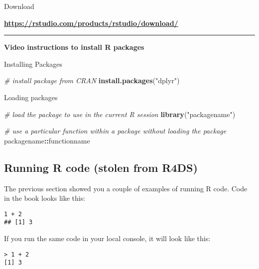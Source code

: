 \documentclass[]{article}
\newenvironment{Shaded}{\begin{snugshade}}{\end{snugshade}}
\newcommand{\CommentTok}[1]{\textcolor[rgb]{0.56,0.35,0.01}{\textit{#1}}}
\newcommand{\KeywordTok}[1]{\textcolor[rgb]{0.13,0.29,0.53}{\textbf{#1}}}
\newcommand{\NormalTok}[1]{#1}
\newcommand{\OperatorTok}[1]{\textcolor[rgb]{0.81,0.36,0.00}{\textbf{#1}}}
\newcommand{\StringTok}[1]{\textcolor[rgb]{0.31,0.60,0.02}{#1}}
\newenvironment{rmdattachment}
  {\begin{center}}
  {\end{center}}
\newenvironment{rmdblankbox}
  {\begin{center}}
  {\end{center}}
\begin{document}
\begin{rmdblankbox}
Download
\end{rmdblankbox}
\begin{rmdattachment}
\textbf{\url{https://rstudio.com/products/rstudio/download/}}
\end{rmdattachment}

\begin{center}\rule{0.5\linewidth}{0.5pt}\end{center}

\textbf{Video instructions to install R packages}

Installing Packages

\begin{Shaded}
\begin{Highlighting}[]
\CommentTok{# install package from CRAN}
\KeywordTok{install.packages}\NormalTok{(}\StringTok{"dplyr"}\NormalTok{)   }
\end{Highlighting}
\end{Shaded}

Loading packages

\begin{Shaded}
\begin{Highlighting}[]
\CommentTok{# load the package to use in the current R session}
\KeywordTok{library}\NormalTok{(}\StringTok{"packagename"}\NormalTok{)         }

\CommentTok{# use a particular function within a package without loading the package}
\NormalTok{packagename}\OperatorTok{::}\NormalTok{functionname   }
\end{Highlighting}
\end{Shaded}

\hypertarget{running-r-code-stolen-from-r4ds}{%
\subsection{ Running R code (stolen from R4DS)}\label{running-r-code-stolen-from-r4ds}}

The previous section showed you a couple of examples of running R code. Code in the book looks like this:

\begin{verbatim}
1 + 2
## [1] 3
\end{verbatim}

If you run the same code in your local console, it will look like this:

\begin{verbatim}
> 1 + 2
[1] 3
\end{verbatim}
\end{document}
